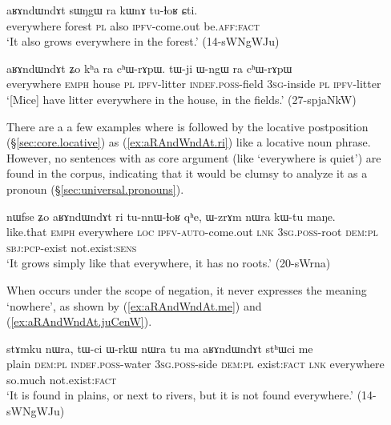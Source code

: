  \begin{exe}
\ex \label{ex:aRAndWndAt.Zo.loc}
\gll  aʁɤndɯndɤt sɯŋgɯ ra kɯnɤ tu-ɬoʁ ɕti. \\
everywhere forest \textsc{pl} also \textsc{ipfv}-come.out be.\textsc{aff}:\textsc{fact} \\
\glt `It also grows everywhere in the forest.' (14-sWNgWJu)
\end{exe} 

 \begin{exe}
\ex \label{ex:aRAndWndAt.Zo.loc2}
\gll  aʁɤndɯndɤt ʑo kʰa ra cʰɯ-rɤpɯ. tɯ-ji ɯ-ngɯ ra cʰɯ-rɤpɯ \\
everywhere \textsc{emph} house \textsc{pl} \textsc{ipfv}-litter \textsc{indef}.\textsc{poss}-field \textsc{3sg}-inside \textsc{pl} \textsc{ipfv}-litter \\
\glt `[Mice] have litter everywhere in the house, in the fields.' (27-spjaNkW)
\end{exe} 

There are a a few examples where  is followed  by the locative postposition  (§\ref{sec:core.locative}) as (\ref{ex:aRAndWndAt.ri}) like a locative noun phrase. However, no sentences with  as core argument (like `everywhere is quiet') are found in the corpus, indicating that it would be clumsy to analyze it as a pronoun (§\ref{sec:universal.pronouns}).

 \begin{exe}
\ex \label{ex:aRAndWndAt.ri}
\gll nɯfse ʑo aʁɤndɯndɤt ri tu-nnɯ-ɬoʁ qʰe, ɯ-zrɤm nɯra kɯ-tu maŋe. \\
like.that \textsc{emph} everywhere \textsc{loc} \textsc{ipfv}-\textsc{auto}-come.out \textsc{lnk} \textsc{3sg}.\textsc{poss}-root \textsc{dem}:\textsc{pl} \textsc{sbj}:\textsc{pcp}-exist not.exist:\textsc{sens} \\
\glt `It grows simply like that everywhere, it has no roots.' (20-sWrna)
\end{exe} 

When  occurs under the scope of negation, it never expresses the meaning `nowhere', as shown by (\ref{ex:aRAndWndAt.me}) and (\ref{ex:aRAndWndAt.juCenW}).

\begin{exe}
\ex \label{ex:aRAndWndAt.me}
\gll stɤmku nɯra, tɯ-ci ɯ-rkɯ nɯra tu ma aʁɤndɯndɤt stʰɯci me \\
plain \textsc{dem}:\textsc{pl} \textsc{indef}.\textsc{poss}-water \textsc{3sg}.\textsc{poss}-side  \textsc{dem}:\textsc{pl} exist:\textsc{fact} \textsc{lnk} everywhere so.much not.exist:\textsc{fact} \\
\glt `It is found in plains, or next to rivers, but it is not found everywhere.' (14-sWNgWJu)
\end{exe} 

